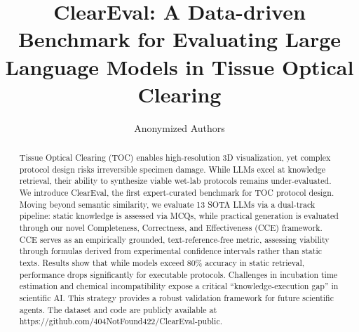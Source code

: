 \documentclass[runningheads]{llncs}
\begin{document}
\title{ClearEval: A Data-driven Benchmark for
Evaluating Large Language Models in Tissue Optical Clearing}

\author{Anonymized Authors}

\maketitle

\begin{abstract}
Tissue Optical Clearing (TOC) enables high-resolution 3D visualization, yet complex protocol design risks irreversible specimen damage. While LLMs excel at knowledge retrieval, their ability to synthesize viable wet-lab protocols remains under-evaluated. We introduce ClearEval, the first expert-curated benchmark for TOC protocol design. Moving beyond semantic similarity, we evaluate 13 SOTA LLMs via a dual-track pipeline: static knowledge is assessed via MCQs, while practical generation is evaluated through our novel Completeness, Correctness, and Effectiveness (CCE) framework. CCE serves as an empirically grounded, text-reference-free metric, assessing viability through formulas derived from experimental confidence intervals rather than static texts. Results show that while models exceed 80\% accuracy in static retrieval, performance drops significantly for executable protocols. Challenges in incubation time estimation and chemical incompatibility expose a critical “knowledge-execution gap” in scientific AI. This strategy provides a robust validation framework for future scientific agents. The dataset and code are publicly available at https://github.com/404NotFound422/ClearEval-public.

\end{abstract}
\end{document}
